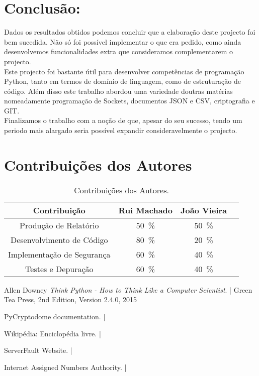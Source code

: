 \chapter{Conclusão:}
\label{chap.conclusão}

Dados os resultados obtidos podemos concluir que a elaboração deste projecto foi bem sucedida. Não só foi possível implementar o que era pedido, como ainda desenvolvemos funcionalidades extra que consideramos complementarem o projecto. \\
Este projecto foi bastante útil para desenvolver competências de programação Python, tanto em termos de domínio de linguagem, como de estruturação de código. Além disso este trabalho abordou uma variedade doutras matérias nomeadamente programação de Sockets, documentos JSON e CSV, criptografia e GIT.\\
Finalizamos o trabalho com a noção de que, apesar do seu sucesso, tendo um periodo mais alargado seria possível expandir consideravelmente o projecto. \\

%
% 
\chapter*{Contribuições dos Autores}

\begin{table}[H]
    \centering
    \caption{Contribuições dos Autores.}
    \begin{tabular}{|c|c|c|c|}\hline
        Contribuição & Rui Machado & João Vieira  \\ 
        \hline
	    Produção de Relatório & 50~\% & 50~\%    \\
	    Desenvolvimento de Código & 80~\% & 20~\%  \\
	    Implementação de Segurança & 60~\% & 40~\% \\ 
		Testes e Depuração & 60~\% & 40~\% \\   
    \hline
    \end{tabular}
    \label{tab.contribuições}
\end{table}	

%
%
\begin{thebibliography}{9}

Allen Downey
\textit{Think Python - How to Think Like a Computer Scientist}. |
Green Tea Press, 2nd Edition, Version 2.4.0, 2015

PyCryptodome documentation. |

Wikipédia: Enciclopédia livre. |

ServerFault Website. |

Internet Assigned Numbers Authority. |


\end{thebibliography}


